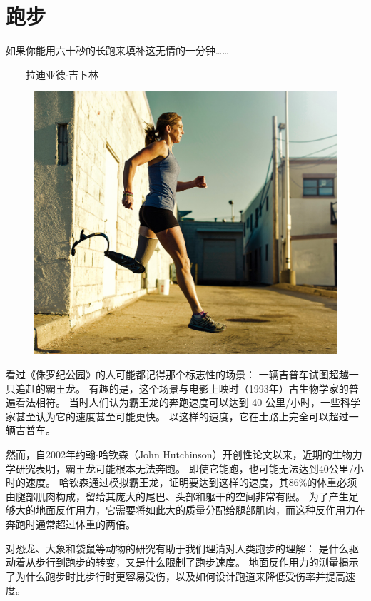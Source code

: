 \chapter{跑步} \label{chap:chap3}

如果你能用六十秒的长跑来填补这无情的一分钟……
\begin{flushright}
	——拉迪亚德$\cdot$吉卜林
\end{flushright}


\begin{figure}[!htb]
	\centering
	\includegraphics[width=1.0\linewidth]{chap3/3_0}
	\caption*{ \label{fig:3_0}}
\end{figure}

看过《侏罗纪公园》的人可能都记得那个标志性的场景：
一辆吉普车试图超越一只追赶的霸王龙。
有趣的是，这个场景与电影上映时（1993年）古生物学家的普遍看法相符。
当时人们认为霸王龙的奔跑速度可以达到 40 公里/小时，一些科学家甚至认为它的速度甚至可能更快。
以这样的速度，它在土路上完全可以超过一辆吉普车。


然而，自2002年约翰$\cdot$哈钦森（John Hutchinson）开创性论文以来，近期的生物力学研究表明，霸王龙可能根本无法奔跑。
即使它能跑，也可能无法达到40公里/小时的速度。
哈钦森通过模拟霸王龙，证明要达到这样的速度，其86\%的体重必须由腿部肌肉构成，留给其庞大的尾巴、头部和躯干的空间非常有限。
为了产生足够大的地面反作用力，它需要将如此大的质量分配给腿部肌肉，而这种反作用力在奔跑时通常超过体重的两倍。


对恐龙、大象和袋鼠等动物的研究有助于我们理清对人类跑步的理解：
是什么驱动着从步行到跑步的转变，又是什么限制了跑步速度。
地面反作用力的测量揭示了为什么跑步时比步行时更容易受伤，以及如何设计跑道来降低受伤率并提高速度。


